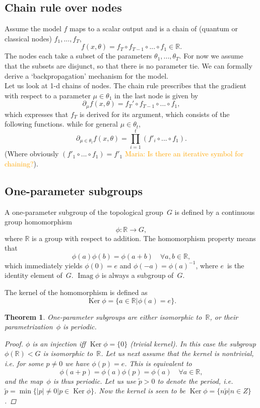 \documentclass[aps,pra,10pt,twocolumn,groupedaddress,nofootinbib]{revtex4-1}
\theoremstyle{plain}
\newtheorem{theorem}{Theorem}%
\DeclareMathOperator{\Ker}{Ker}    %
\DeclareMathOperator{\Imag}{Imag}  %
\newcommand{\be}{\begin{equation}}
\newcommand{\ee}{\end{equation}}
\newcommand{\R}{\ensuremath{\mathbb R}}  %
\newcommand{\maria}[1]{\textcolor{orange}{Maria: #1}}
\begin{document}
\subsection{Chain rule over nodes}

Assume the model $f$ maps to a scalar output and is a chain of (quantum or classical nodes) $f_1,...,f_T$,
\[ f(x, \theta) = f_T \circ f_{T-1} \circ ... \circ f_1 \in \mathbb{R}.\]
The nodes each take a subset of the parameters $\theta_1,...,\theta_T$. For now we assume that the subsets are disjunct, so that there is no parameter tie. We can formally derive a `backpropagation' mechanism for the model.\\

Let us look at 1-d chains of nodes. The chain rule prescribes that the gradient with respect to a parameter $\mu \in \theta_1$ in the last node is given by
\[ \partial_{\mu} f(x, \theta) =  f_T' \circ f_{T-1} \circ ... \circ f_1, \]
which expresses that $f_T$ is derived for its argument, which consists of the following functions. 
while for general $\mu \in \theta_t$, 
\[ \partial_{\mu \in \theta_t} f(x, \theta) = \prod_{i=1}^t ( f'_i \circ ... \circ f_1 ). \]
(Where obviously $( f'_1 \circ ... \circ f_1 ) = f'_1$ \maria{Is there an iterative symbol for chaining?}).





\subsection{One-parameter subgroups}

A one-parameter subgroup of the topological group~$G$ is defined by a continuous group homomorphism
\be
\phi: \R \to G,
\ee
where $\R$ is a group with respect to addition.
The homomorphism property means that
\be
\phi(a)\phi(b) = \phi(a+b) \quad \forall a,b \in \R,
\ee
which immediately yields
$\phi(0) = e$ and $\phi(-a) = \phi(a)^{-1}$,
where $e$~is the identity element of~$G$.
$\Imag \phi$ is always a subgroup of~$G$.

The kernel of the homomorphism is defined as
\be
\Ker \phi = \{a \in \R | \phi(a) = e\}.
\ee

\begin{theorem}
  \label{th:1psg}
One-parameter subgroups are either isomorphic to~$\R$, or their parametrization~$\phi$ is periodic.

\begin{proof}
$\phi$ is an injection iff $\Ker \phi = \{0\}$ (trivial kernel).
In this case the subgroup $\phi(\R) < G$ is isomorphic to~$\R$.
Let us next assume that the kernel is nontrivial, i.e. for some $p \neq 0$ we have
$\phi(p) = e$.
This is equivalent to
\be
\phi(a+p) = \phi(a)\phi(p) = \phi(a) \quad \forall a \in \R,
\ee
and the map~$\phi$ is thus periodic. Let us use $\tilde{p}>0$
to denote the period, i.e.
$\tilde{p} = \min \{|p| \neq 0 | p \in \Ker \phi\}$.
Now the kernel is seen to be $\Ker \phi = \{n \tilde{p} | n \in Z\}$.
\end{proof}
\end{theorem}
\end{document}
